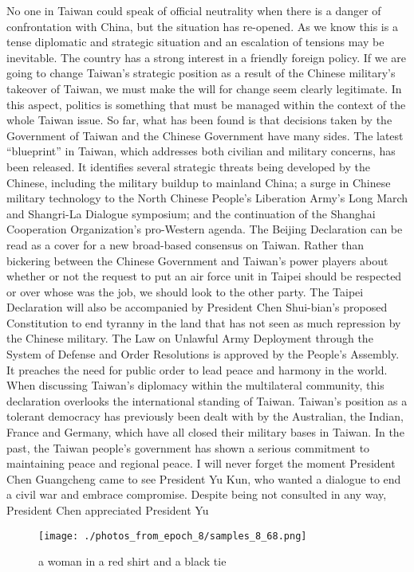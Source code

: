 \documentclass{article}%
\begin{document}
No one in Taiwan could speak of official neutrality when there is a danger of confrontation with China, but the situation has re{-}opened. As we know this is a tense diplomatic and strategic situation and an escalation of tensions may be inevitable. The country has a strong interest in a friendly foreign policy. If we are going to change Taiwan’s strategic position as a result of the Chinese military’s takeover of Taiwan, we must make the will for change seem clearly legitimate. In this aspect, politics is something that must be managed within the context of the whole Taiwan issue. So far, what has been found is that decisions taken by the Government of Taiwan and the Chinese Government have many sides.\newline%
The latest “blueprint” in Taiwan, which addresses both civilian and military concerns, has been released. It identifies several strategic threats being developed by the Chinese, including the military buildup to mainland China; a surge in Chinese military technology to the North Chinese People’s Liberation Army’s Long March and Shangri{-}La Dialogue symposium; and the continuation of the Shanghai Cooperation Organization’s pro{-}Western agenda.\newline%
The Beijing Declaration can be read as a cover for a new broad{-}based consensus on Taiwan. Rather than bickering between the Chinese Government and Taiwan’s power players about whether or not the request to put an air force unit in Taipei should be respected or over whose was the job, we should look to the other party. The Taipei Declaration will also be accompanied by President Chen Shui{-}bian’s proposed Constitution to end tyranny in the land that has not seen as much repression by the Chinese military.\newline%
The Law on Unlawful Army Deployment through the System of Defense and Order Resolutions is approved by the People’s Assembly. It preaches the need for public order to lead peace and harmony in the world.\newline%
When discussing Taiwan’s diplomacy within the multilateral community, this declaration overlooks the international standing of Taiwan. Taiwan’s position as a tolerant democracy has previously been dealt with by the Australian, the Indian, France and Germany, which have all closed their military bases in Taiwan.\newline%
In the past, the Taiwan people’s government has shown a serious commitment to maintaining peace and regional peace. I will never forget the moment President Chen Guangcheng came to see President Yu Kun, who wanted a dialogue to end a civil war and embrace compromise. Despite being not consulted in any way, President Chen appreciated President Yu

%


\begin{figure}[h!]%
\centering%
\texttt{[image: ./photos\_from\_epoch\_8/samples\_8\_68.png]}%
\caption{a woman in a red shirt and a black tie}%
\end{figure}

%
\end{document}
